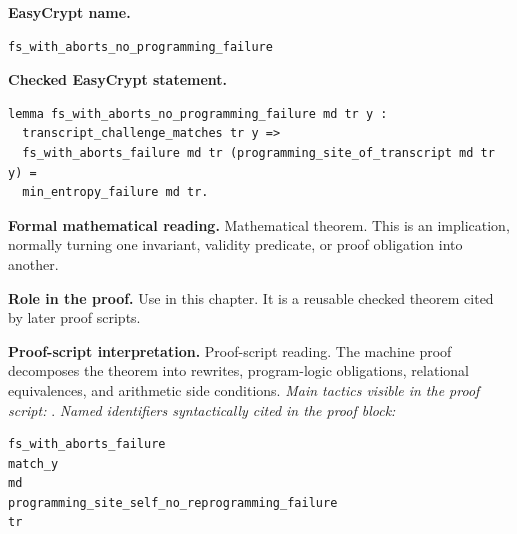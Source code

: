 \begin{formaltheorem}
\noindent\textbf{EasyCrypt name.}
\begin{lstlisting}[language=EasyCrypt,basicstyle=\ttfamily\scriptsize]
fs_with_aborts_no_programming_failure
\end{lstlisting}
\noindent\textbf{Checked EasyCrypt statement.}
\begin{lstlisting}[language=EasyCrypt,basicstyle=\ttfamily\scriptsize]
lemma fs_with_aborts_no_programming_failure md tr y :
  transcript_challenge_matches tr y =>
  fs_with_aborts_failure md tr (programming_site_of_transcript md tr y) =
  min_entropy_failure md tr.
\end{lstlisting}
\noindent\textbf{Formal mathematical reading.}
Mathematical theorem. This is an implication, normally turning one invariant, validity predicate, or proof obligation into another.

\noindent\textbf{Role in the proof.}
Use in this chapter. It is a reusable checked theorem cited by later proof scripts.

\noindent\textbf{Proof-script interpretation.}
Proof-script reading. The machine proof decomposes the theorem into rewrites, program-logic obligations, relational equivalences, and arithmetic side conditions.
\emph{Main tactics visible in the proof script:} .
\emph{Named identifiers syntactically cited in the proof block:}
\begin{lstlisting}[language=EasyCrypt,basicstyle=\ttfamily\scriptsize]
fs_with_aborts_failure
match_y
md
programming_site_self_no_reprogramming_failure
tr
\end{lstlisting}

\end{formaltheorem}

